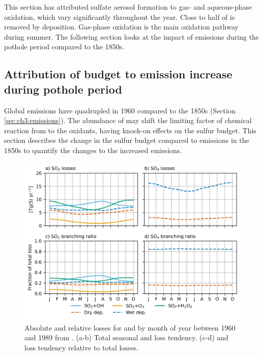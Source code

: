 This section has attributed sulfate aerosol formation to gas- and aqueous-phase oxidation, which vary significantly throughout the year. Close to half of  is removed by deposition. Gas-phase oxidation is the main oxidation pathway during summer. The following section looks at the impact of  emissions during the pothole period compared to the 1850s.

\subsection{Attribution of \textsoo{} budget to \textsoo{} emission increase during pothole period}

Global  emissions have quadrupled in 1960 compared to the 1850s (Section \ref{sec:ch3:emissions}). The abundance of  may shift the limiting factor of chemical reaction from  to the oxidants, having knock-on effects on the sulfur budget. This section describes the change in the sulfur budget compared to emissions in the 1850s to quantify the changes to the increased emissions. 

\begin{figure}
    \centering
    \includegraphics{Chapter4/Figs/branching_ratio_sstpiaer_pothole.png}
    \caption[Absolute and relative losses for  and  by month of year between 1960 and 1989 when aerosol precursor emissions are constrained at 1850 level (\sstpiaer{})]{Absolute and relative losses for  and  by month of year between 1960 and 1989 from \sstpiaer{}. (a-b) Total seasonal  and  loss tendency. (c-d)  and  loss tendency relative to total losses.}
    \label{fig:ch4:seasonal-branching-ratio-sstpiaer}
\end{figure}


